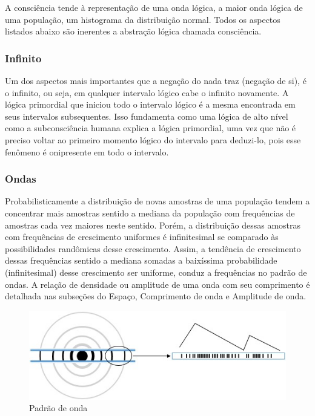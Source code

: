 A consciência tende à representação de uma onda lógica, a maior onda lógica de uma população, um histograma da distribuição normal. Todos os aspectos listados abaixo são inerentes a abstração lógica chamada consciência.

\subsubsection{Infinito}
Um dos aspectos mais importantes que a negação do nada traz (negação de si), é o infinito, ou seja, em qualquer intervalo lógico cabe o infinito novamente. A lógica primordial que iniciou todo o intervalo lógico é a mesma encontrada em seus intervalos subsequentes. Isso fundamenta como uma lógica de alto nível como a subconsciência humana explica a lógica primordial, uma vez que não é preciso voltar ao primeiro momento lógico do intervalo para deduzi-lo, pois esse fenômeno é onipresente em todo o intervalo.

\subsubsection{Ondas}
Probabilisticamente a distribuição de novas amostras de uma população tendem a concentrar mais amostras sentido a mediana da população com frequências de amostras cada vez maiores neste sentido. Porém, a distribuição dessas amostras com frequências de crescimento uniformes é infinitesimal se comparado às possibilidades randômicas desse crescimento. Assim, a tendência de crescimento dessas frequências sentido a mediana somadas a baixíssima probabilidade (infinitesimal) desse crescimento ser uniforme, conduz a frequências no padrão de ondas. A relação de densidade ou amplitude de uma onda com seu comprimento é detalhada nas subseções do Espaço, Comprimento de onda e Amplitude de onda.
	\begin{figure}[H]
	\caption{Padrão de onda}
	\label{fig:consciousness_waves}
	\centering
	\includegraphics[scale=1]{sections/images/consciousness_waves.jpg}
	\end{figure}

